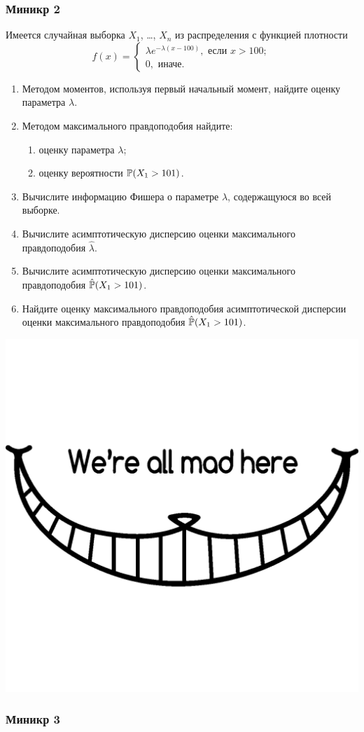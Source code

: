 \subsubsection*{Миникр 2}

Имеется случайная выборка $X_1$, \ldots, $X_n$ из распределения с функцией плотности
\[
f(x) = \begin{cases}
  \lambda e^{-\lambda(x-100)}, \text{ если } x > 100; \\
  0, \text{ иначе.}  
\end{cases}
\]
  
\begin{enumerate}
\item Методом моментов, используя первый начальный момент, найдите оценку параметра $\lambda$.
\item Методом максимального правдоподобия найдите:
\begin{enumerate}
\item оценку параметра $\lambda$;
\item оценку вероятности $\P(X_1 > 101)$.
\end{enumerate}
\item Вычислите информацию Фишера о параметре $\lambda$, содержащуюся во всей выборке.
\item Вычислите асимптотическую дисперсию оценки максимального правдоподобия $\hat\lambda$.
\item Вычислите асимптотическую дисперсию оценки максимального правдоподобия $\hat\P(X_1 > 101)$.
\item Найдите оценку максимального правдоподобия асимптотической дисперсии оценки максимального правдоподобия  
$\hat\P(X_1 > 101)$.
\end{enumerate}
\begin{center}
\begin{minipage}{3cm}
  \includegraphics[height=20ex]{images/cheshire_cat.png}
\end{minipage}
\end{center}



\subsubsection*{Миникр 3}

